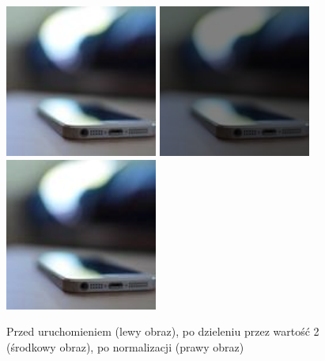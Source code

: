\documentclass[a4paper,12pt]{book}
\begin{document}
\begin{figure}[H]
	\caption{Przed uruchomieniem (lewy obraz), po dzieleniu przez wartość 2 (środkowy obraz), po normalizacji (prawy obraz)}
	\includegraphics[width=5cm, height=5cm]{phone-unmodified.jpg}
	\includegraphics[width=5cm, height=5cm]{3-5/divide-color-const-phone-2.png}
	\includegraphics[width=5cm, height=5cm]{3-5/divide-color-const-phone-2-norm.png}
\end{figure}
\end{document}
